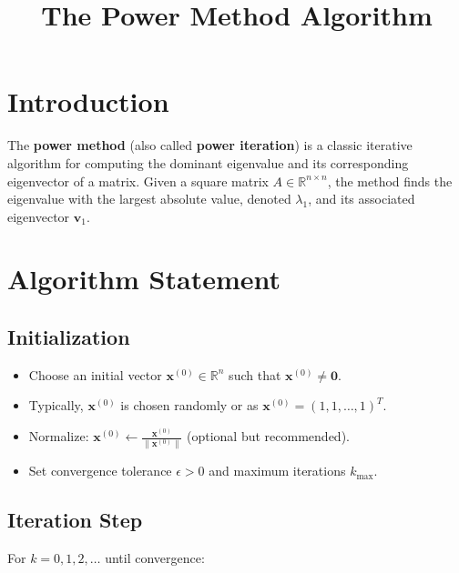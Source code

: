 \documentclass[11pt, a4paper]{article}
\title{\textbf{The Power Method Algorithm}}
\author{}
\date{}
\begin{document}
\maketitle

\section{Introduction}

The \textbf{power method} (also called \textbf{power iteration}) is a classic iterative algorithm for computing the dominant eigenvalue and its corresponding eigenvector of a matrix. Given a square matrix $A \in \mathbb{R}^{n \times n}$, the method finds the eigenvalue with the largest absolute value, denoted $\lambda_1$, and its associated eigenvector $\mathbf{v}_1$.

\section{Algorithm Statement}

\subsection{Initialization}

\begin{itemize}
    \item Choose an initial vector $\mathbf{x}^{(0)} \in \mathbb{R}^n$ such that $\mathbf{x}^{(0)} \neq \mathbf{0}$. 
    \item Typically, $\mathbf{x}^{(0)}$ is chosen randomly or as $\mathbf{x}^{(0)} = (1, 1, \ldots, 1)^T$.
    \item Normalize: $\mathbf{x}^{(0)} \leftarrow \frac{\mathbf{x}^{(0)}}{\|\mathbf{x}^{(0)}\|}$ (optional but recommended).
    \item Set convergence tolerance $\epsilon > 0$ and maximum iterations $k_{\max}$.
\end{itemize}

\subsection{Iteration Step}

For $k = 0, 1, 2, \ldots$ until convergence:
\end{document}
